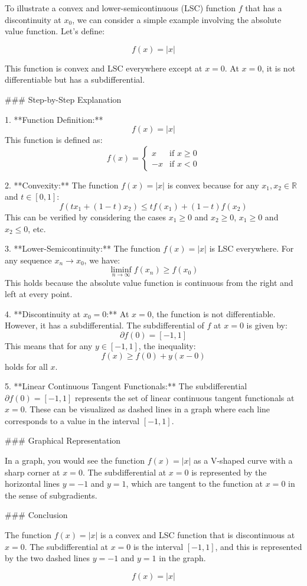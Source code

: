To illustrate a convex and lower-semicontinuous (LSC) function \( f \) that has a discontinuity at \( x_0 \), we can consider a simple example involving the absolute value function. Let's define:

\[ f(x) = |x| \]

This function is convex and LSC everywhere except at \( x = 0 \). At \( x = 0 \), it is not differentiable but has a subdifferential.

### Step-by-Step Explanation

1. **Function Definition:**
   \[ f(x) = |x| \]
   This function is defined as:
   \[
   f(x) = 
   \begin{cases} 
   x & \text{if } x \geq 0 \\
   -x & \text{if } x < 0 
   \end{cases}
   \]

2. **Convexity:**
   The function \( f(x) = |x| \) is convex because for any \( x_1, x_2 \in \mathbb{R} \) and \( t \in [0, 1] \):
   \[
   f(tx_1 + (1-t)x_2) \leq tf(x_1) + (1-t)f(x_2)
   \]
   This can be verified by considering the cases \( x_1 \geq 0 \) and \( x_2 \geq 0 \), \( x_1 \geq 0 \) and \( x_2 \leq 0 \), etc.

3. **Lower-Semicontinuity:**
   The function \( f(x) = |x| \) is LSC everywhere. For any sequence \( x_n \to x_0 \), we have:
   \[
   \liminf_{n \to \infty} f(x_n) \geq f(x_0)
   \]
   This holds because the absolute value function is continuous from the right and left at every point.

4. **Discontinuity at \( x_0 = 0 \):**
   At \( x = 0 \), the function is not differentiable. However, it has a subdifferential. The subdifferential of \( f \) at \( x = 0 \) is given by:
   \[
   \partial f(0) = [-1, 1]
   \]
   This means that for any \( y \in [-1, 1] \), the inequality:
   \[
   f(x) \geq f(0) + y(x - 0)
   \]
   holds for all \( x \).

5. **Linear Continuous Tangent Functionals:**
   The subdifferential \( \partial f(0) = [-1, 1] \) represents the set of linear continuous tangent functionals at \( x = 0 \). These can be visualized as dashed lines in a graph where each line corresponds to a value in the interval \([-1, 1]\).

### Graphical Representation

In a graph, you would see the function \( f(x) = |x| \) as a V-shaped curve with a sharp corner at \( x = 0 \). The subdifferential at \( x = 0 \) is represented by the horizontal lines \( y = -1 \) and \( y = 1 \), which are tangent to the function at \( x = 0 \) in the sense of subgradients.

### Conclusion

The function \( f(x) = |x| \) is a convex and LSC function that is discontinuous at \( x = 0 \). The subdifferential at \( x = 0 \) is the interval \([-1, 1]\), and this is represented by the two dashed lines \( y = -1 \) and \( y = 1 \) in the graph.

\[
\boxed{f(x) = |x|}
\]